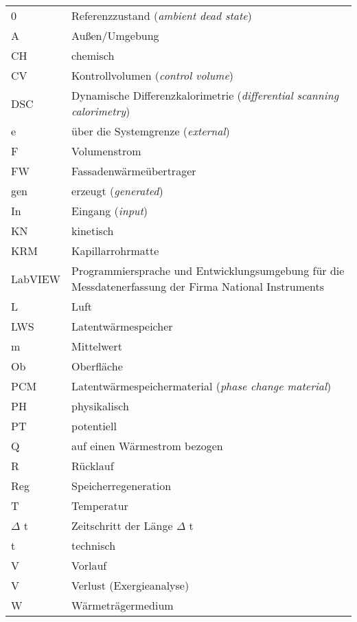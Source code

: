 \begin{onehalfspacing}
\begin{longtable}[h]{p{} p{}}
		0 		& Referenzzustand (\emph{ambient dead state})\\
		A 		& Außen/Umgebung\\ 		
		CH 		& chemisch\\
		CV 		& Kontrollvolumen (\emph{control volume})\\
		DSC 	& Dynamische Differenzkalorimetrie (\emph{differential scanning calorimetry}) \\
		e 		& über die Systemgrenze (\emph{external})\\
		F 		& Volumenstrom\\	
		FW 		& Fassadenwärmeübertrager\\
		gen 	& erzeugt (\emph{generated})\\
		In 		& Eingang (\emph{input})\\
		KN 		& kinetisch\\
		KRM 	& Kapillarrohrmatte\\
		LabVIEW & Programmiersprache und Entwicklungsumgebung für die Messdatenerfassung der Firma National Instruments\\
		L 		& Luft\\
		LWS 	& Latentwärmespeicher\\	
		m 		& Mittelwert\\
		Ob		&Oberfläche\\
		PCM 	& Latentwärmespeichermaterial (\emph{phase change material})\\
		PH 		& physikalisch\\
		PT 		& potentiell\\
		Q 		& auf einen Wärmestrom bezogen\\
		R 		& Rücklauf\\
		Reg		& Speicherregeneration\\
		T 		& Temperatur\\
		$\Delta$ t & Zeitschritt der Länge $\Delta$ t\\
		t 		& technisch\\
		V 		& Vorlauf\\
		V 		& Verlust (Exergieanalyse)\\
		W		& Wärmeträgermedium\\
		
\end{longtable}
\end{onehalfspacing}
